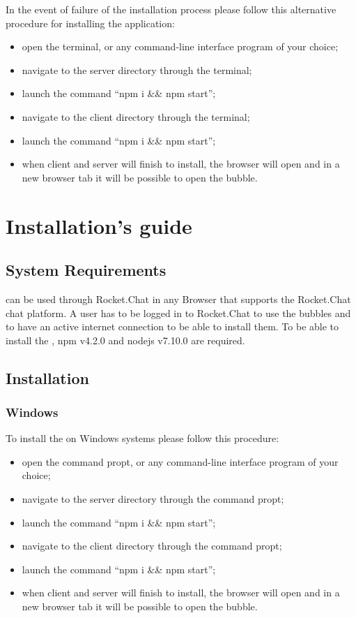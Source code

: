 In the event of failure of the installation process please follow this alternative procedure for installing the application:
\begin{itemize}
	\item open the terminal, or any command-line interface program of your choice;
	\item navigate to the server directory through the terminal;
	\item launch the command ``npm i \&\& npm start'';
	\item navigate to the client directory through the terminal;
	\item launch the command ``npm i \&\& npm start'';
	\item when client and server will finish to install, the browser will open and in a new browser tab it will be possible to open the bubble.
\end{itemize}

\section{\DemoName{} Installation's guide}

\subsection{ \DemoName{} System Requirements}
\DemoName{} can be used through Rocket.Chat in any Browser that supports the Rocket.Chat chat platform.
A user has to be logged in to Rocket.Chat to use the bubbles and to have an active internet connection to be able to install them.
To be able to install the \DemoName{}, npm v4.2.0 and nodejs v7.10.0 are required.

\subsection{Installation}

\subsubsection{Windows}

To install the \DemoName{} on Windows systems please follow this procedure:
\begin{itemize}
	\item open the command propt, or any command-line interface program of your choice;
	\item navigate to the server directory through the command propt;
	\item launch the command ``npm i \&\& npm start'';
	\item navigate to the client directory through the command propt;
	\item launch the command ``npm i \&\& npm start'';
	\item when client and server will finish to install, the browser will open and in a new browser tab it will be possible to open the bubble.
\end{itemize}

